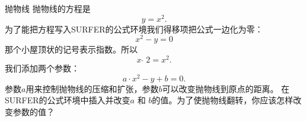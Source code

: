 ﻿\begin{surferPage}{抛物线}
抛物线的方程是 \[y=x^2.\]
为了能把方程写入SURFER的公式环境我们得移项把公式一边化为零：
\[x^2-y=0\]
那个小屋顶状的记号表示指数。所以
\[ x  \,\hat{\ } \, 2 =x^2.\]
我们添加两个参数：
\[a \cdot x^2-y+b=0.\]
参数$a$用来控制抛物线的压缩和扩张，参数$b$可以改变抛物线到原点的距离。
\newline
在SURFER的公式环境中插入并改变$a$ 和 $b$的值。为了使抛物线翻转，你应该怎样改变参数的值？
\end{surferPage}
